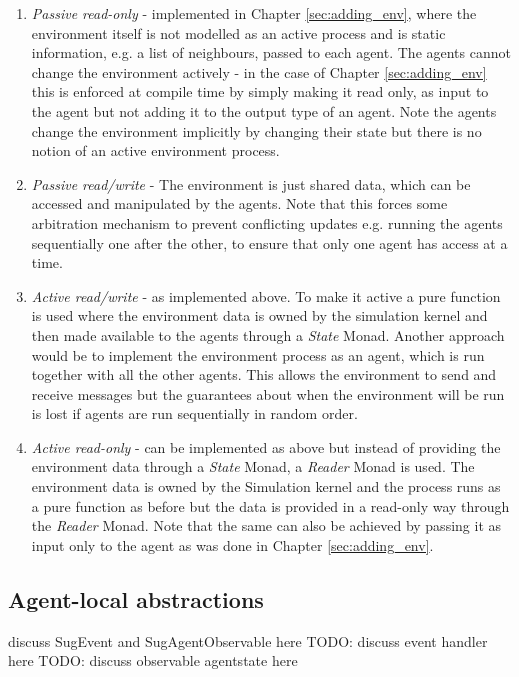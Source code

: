 \begin{enumerate}
	\item \textit{Passive read-only} - implemented in Chapter \ref{sec:adding_env}, where the environment itself is not modelled as an active process and is static information, e.g. a list of neighbours, passed to each agent. The agents cannot change the environment actively - in the case of Chapter \ref{sec:adding_env} this is enforced at compile time by simply making it read only, as input to the agent but not adding it to the output type of an agent. Note the agents change the environment implicitly by changing their state but there is no notion of an active environment process.
	
	\item \textit{Passive read/write} - The environment is just shared data, which can be accessed and manipulated by the agents. Note that this forces some arbitration mechanism to prevent conflicting updates e.g. running the agents sequentially one after the other, to ensure that only one agent has access at a time.
	
	\item \textit{Active read/write} - as implemented above. To make it active a pure function is used where the environment data is owned by the simulation kernel and then made available to the agents through a \textit{State} Monad. Another approach would be to implement the environment process as an agent, which is run together with all the other agents. This allows the environment to send and receive messages but the guarantees about when the environment will be run is lost if agents are run sequentially in random order.
	
	\item \textit{Active read-only} - can be implemented as above but instead of providing the environment data through a \textit{State} Monad, a \textit{Reader} Monad is used. The environment data is owned by the Simulation kernel and the process runs as a pure function as before but the data is provided in a read-only way through the \textit{Reader} Monad. Note that the same can also be achieved by passing it as input only to the agent as was done in Chapter \ref{sec:adding_env}.
\end{enumerate}

\subsection{Agent-local abstractions}
discuss SugEvent and SugAgentObservable here
TODO: discuss event handler here
TODO: discuss observable agentstate here

